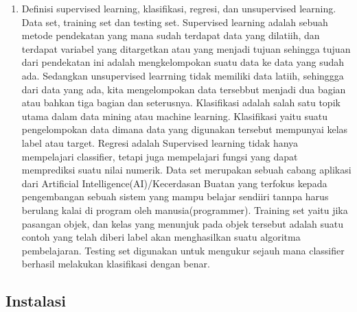 \begin{enumerate}
\item  Definisi supervised learning, klasifikasi, regresi, dan unsupervised learning. Data set, training set dan testing set. 
\subitem Supervised learning adalah sebuah metode pendekatan yang mana sudah terdapat data yang dilatiih, dan terdapat variabel yang ditargetkan atau yang menjadi tujuan sehingga tujuan dari pendekatan ini adalah mengkelompokan suatu data ke data yang sudah ada. Sedangkan unsupervised learrning tidak memiliki data latiih, sehinggga dari data yang ada, kita mengelompokan data tersebbut menjadi dua bagian atau bahkan tiga bagian dan seterusnya.
\subitem Klasifikasi adalah salah satu topik utama dalam data mining atau machine learning. Klasifikasi yaitu suatu pengelompokan data dimana data yang digunakan tersebut mempunyai kelas label atau target.
\subitem Regresi adalah Supervised learning tidak hanya mempelajari classifier, tetapi juga mempelajari fungsi yang dapat memprediksi suatu nilai numerik. 
\subitem Data set merupakan sebuah cabang aplikasi dari Artificial Intelligence(AI)/Kecerdasan Buatan yang terfokus kepada pengembangan sebuah sistem yang mampu belajar sendiiri tannpa harus berulang kalai di program oleh manusia(programmer).
\subitem Training set yaitu jika pasangan objek, dan kelas yang menunjuk pada objek tersebut adalah suatu contoh yang telah diberi label akan menghasilkan suatu algoritma pembelajaran.
\subitem Testing set digunakan untuk mengukur sejauh mana classifier berhasil melakukan klasifikasi dengan benar\cite{zhu2009introduction}.
\end{enumerate}

\subsection{Instalasi}
